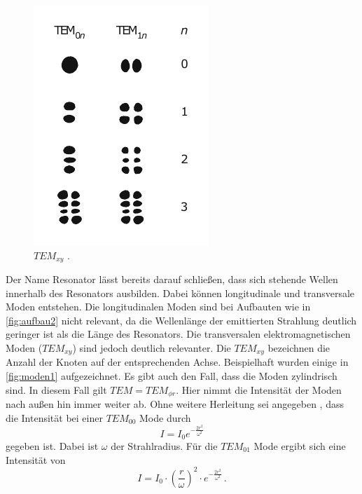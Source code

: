\begin{figure}
    \includegraphics[width=\linewidth]{pictures/moden1.pdf}
    \caption{$TEM_{xy}$ \cite{HeNe_levels}.}
    \label{fig:moden1}
\end{figure}
Der Name Resonator lässt bereits darauf schließen, dass sich stehende Wellen innerhalb des Resonators ausbilden.
Dabei können longitudinale und transversale Moden entstehen.
Die longitudinalen Moden sind bei Aufbauten wie in \autoref{fig:aufbau2} nicht relevant, da die Wellenlänge der emittierten Strahlung deutlich geringer ist als die Länge des Resonators.
Die transversalen elektromagnetischen Moden ($TEM_{xy}$) sind jedoch deutlich relevanter.
Die $TEM_{xy}$ bezeichnen die Anzahl der Knoten auf der entsprechenden Achse.
Beispielhaft wurden einige in \autoref{fig:moden1} aufgezeichnet.
Es gibt auch den Fall, dass die Moden zylindrisch sind.
In diesem Fall gilt $TEM = TEM_{\phi r}$.
Hier nimmt die Intensität der Moden nach außen hin immer weiter ab.
Ohne weitere Herleitung sei angegeben \cite{demtroeder_laser}, dass die Intensität bei einer $TEM_{00}$ Mode durch
\begin{equation} \label{eq:tem00}
    I  =I_0 e^{- \frac{2 r^2}{\omega^2}}
\end{equation}
gegeben ist. Dabei ist $\omega$ der Strahlradius.
Für die $TEM_{01}$ Mode ergibt sich eine Intensität von
\begin{equation} \label{eq:tem01}
    I  =I_0 \cdot \left( \frac{r}{\omega} \right)^2 \cdot e^{- \frac{2 r^2}{\omega^2}} \, .
\end{equation}

